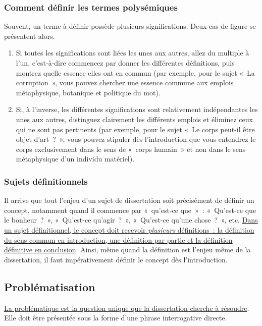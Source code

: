 \documentclass[a4paper,12pt]{article}
\begin{document}
\subsubsection{Comment définir les termes polysémiques}
\label{sec-2-2-4}

Souvent, un terme à définir possède plusieurs significations. Deux cas
de figure se présentent alors. 

\begin{enumerate}
\item Si toutes les significations sont liées les unes aux autres, allez du
multiple à l'un, c'est-à-dire commencez par donner les différentes
définitions, puis montrez quelle essence elles ont en commun (par
exemple, pour le sujet « La corruption », vous pouvez chercher une
essence commune aux emplois métaphysique, botanique et politique du
mot).
\item Si, à l'inverse, les différentes significations sont relativement
indépendantes les unes aux autres, distinguez clairement les
différents emplois et éliminez ceux qui ne sont pas pertinents (par
exemple, pour le sujet « Le corps peut-il être objet d'art ? », vous
pouvez stipuler dès l'introduction que vous entendrez le corps
exclusivement dans le sens de « corps humain » et non dans le sens
métaphysique d'un individu matériel).
\end{enumerate}

\subsubsection{Sujets définitionnels}
\label{sec-2-2-5}

Il arrive que tout l'enjeu d'un sujet de dissertation soit précisément
de définir un concept, notamment quand il commence par « qu'est-ce
que » : « Qu'est-ce que le bonheur ? », « Qu'est-ce qu'agir ? »,
« Qu'est-ce qu'une chose ? », etc. \uline{Dans un sujet définitionnel, le
concept doit recevoir \emph{plusieurs} définitions : la définition du sens
commun en introduction, une définition par partie et la définition
définitive en conclusion}. Ainsi, même quand la définition est l'enjeu
même de la dissertation, il faut impérativement définir le concept dès
l'introduction.


\subsection{Problématisation}
\label{sec-2-3}
\label{problematisation}

\uline{La problématique est la question unique que la dissertation cherche à
résoudre}. Elle doit être présentée sous la forme d'une phrase
interrogative directe.
\end{document}

